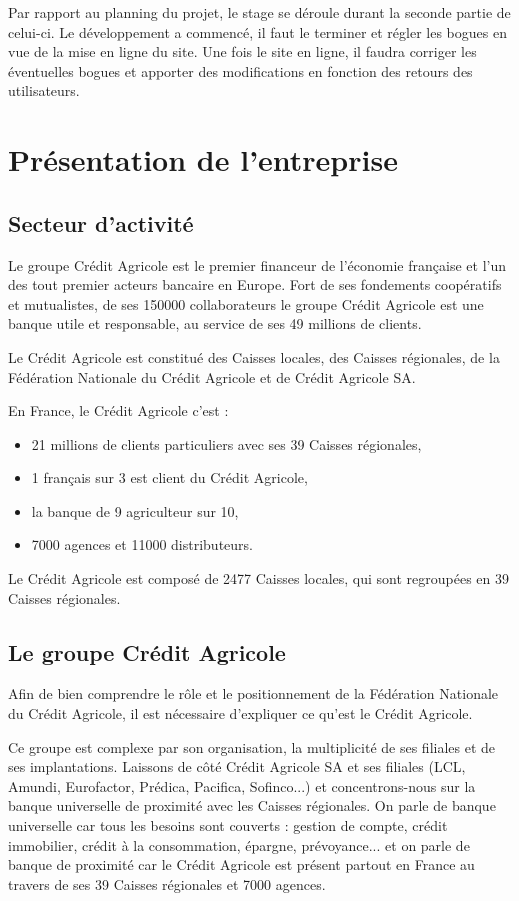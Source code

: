 \documentclass[12pt,a4paper]{article}
\begin{document}
\medskip
Par rapport au planning du projet, le stage se déroule durant la seconde partie de celui-ci. Le développement a commencé, il faut le terminer et régler les bogues en vue de la mise en ligne du site. Une fois le site en ligne, il faudra corriger les éventuelles bogues et apporter des modifications en fonction des retours des utilisateurs.\par

\newpage

\section{Présentation de l'entreprise}
\subsection{Secteur d'activité}
Le groupe Crédit Agricole est le  premier financeur de l'économie française et l'un des tout premier acteurs bancaire en Europe. Fort de ses fondements coopératifs et mutualistes, de ses 150000 collaborateurs le groupe Crédit Agricole est une banque utile et responsable, au service de ses 49 millions de clients.\par 
Le Crédit Agricole est constitué des Caisses locales, des Caisses régionales, de la Fédération Nationale du Crédit Agricole et de Crédit Agricole SA.\par
\bigskip
En France, le Crédit Agricole c'est :
\begin{itemize}
\item 21 millions de clients particuliers avec ses 39 Caisses régionales,
\item 1 français sur 3 est client du Crédit Agricole,
\item la banque de 9 agriculteur sur 10,
\item 7000 agences et 11000 distributeurs.
\end{itemize}\par
Le Crédit Agricole est composé de 2477 Caisses locales, qui sont regroupées en 39 Caisses régionales.\par

\subsection{Le groupe Crédit Agricole}
Afin de bien comprendre le rôle et le positionnement de la Fédération Nationale du Crédit Agricole, il est nécessaire d'expliquer ce qu'est le Crédit Agricole.\par
Ce groupe est complexe par son organisation, la multiplicité de ses filiales et de ses implantations.
Laissons de côté Crédit Agricole SA et ses filiales (LCL, Amundi, Eurofactor, Prédica, Pacifica, Sofinco...) et concentrons-nous sur la banque universelle de proximité avec les Caisses régionales.
On parle de banque universelle car tous les besoins sont couverts : gestion de compte, crédit immobilier, crédit à la consommation, épargne, prévoyance... et on parle de banque de proximité car le Crédit Agricole est présent partout en France au travers de ses 39 Caisses régionales et 7000 agences. \par
\end{document}
